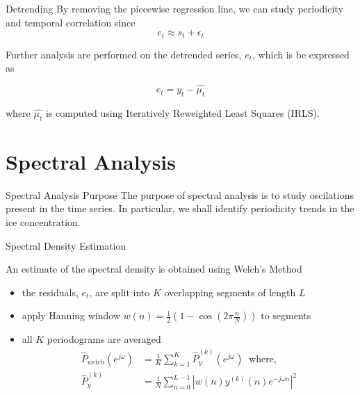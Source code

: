 \documentclass[10pt]{beamer}
\begin{document}
\begin{frame}{Detrending}
By removing the piecewise regression line, we can study periodicity and temporal correlation since 
$$e_t \approx s_t + \epsilon_t$$

Further analysis are performed on the detrended series, $e_t$, which is be expressed as

$$e_t = y_t - \hat{\mu_t}$$

where $\hat{\mu_t}$ is computed using Iteratively Reweighted Least Squares (IRLS).

\end{frame}


\section{Spectral Analysis}

\begin{frame}{Spectral Analysis Purpose}
The purpose of spectral analysis is to study oscilations present in the time series. In particular, we shall identify periodicity trends in the ice concentration.
\end{frame}

\begin{frame}{Spectral Density Estimation}
\setlength{\abovedisplayskip}{0pt}
\setlength{\belowdisplayskip}{0pt}
\setlength{\abovedisplayshortskip}{0pt}
\setlength{\belowdisplayshortskip}{0pt}

An estimate of the spectral density is obtained using Welch's Method

\setlength{\abovedisplayskip}{0pt}
\setlength{\belowdisplayskip}{0pt}
\begin{itemize}
\item the residuals, $e_t$, are split into $K$ overlapping segments of length $L$
\item apply Hanning window $w(n) = \frac{1}{2}({1} - {\cos{(2\pi\frac{n}{N})}})$ to segments
\item all $K$ periodograms are averaged \\
\setlength{\mathindent}{0pt}
\setlength{\abovedisplayskip}{0pt}
\setlength{\belowdisplayskip}{0pt}
\begin{align*}
\hat{P}_{welch}(e^{j\omega}) &= \frac{1}{K} \sum_{k=1}^{K} \hat{P}_{y}^{(k)}(e^{j\omega})
\: \text{  where,} \\
\hat{P}_{y}^{(k)} &= 
			\frac{1}{N} \sum_{n=0}^{L-1} \left|w(n)y^{(k)}(n) e^{-j \omega n}\right|^{2}
\end{align*}
\end{itemize}


\end{frame}
  
\end{document}

